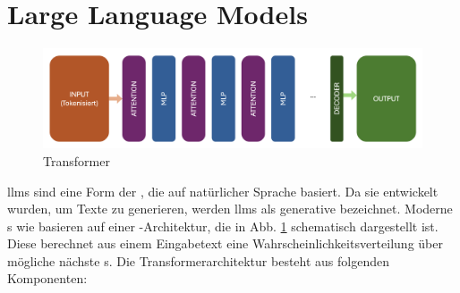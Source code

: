 \documentclass[../main.tex]{subfiles}
\begin{document}
\section{Large Language Models}
\label{sec:llm}

\begin{figure}[h!]
  \includegraphics[scale=0.37]{bilder/Transformer.png}
  \caption{Transformer}
  \label{fig:trans}
\end{figure}

\glspl{llm} sind eine Form der , die auf natürlicher Sprache basiert. Da sie entwickelt wurden, um Texte zu generieren, werden \glspl{llm} als generative 
 bezeichnet. Moderne s wie  basieren auf einer -Architektur, die in Abb. \ref{fig:trans} schematisch dargestellt ist. Diese 
berechnet aus einem Eingabetext eine Wahrscheinlichkeitsverteilung über mögliche nächste s. Die Transformerarchitektur besteht aus folgenden Komponenten:\cite{architecture}\\
\end{document}
